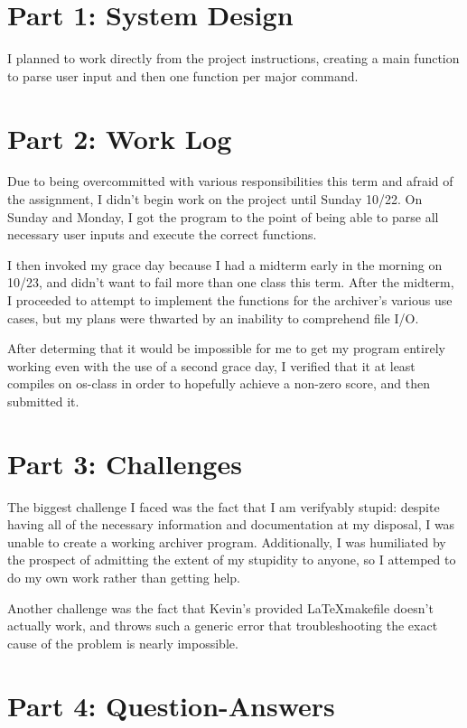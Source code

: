 \documentclass[letterpaper,10pt,titlepage]{article}
\begin{document}
\tableofcontents

\section{Part 1: System Design}

I planned to work directly from the project instructions, creating a main function to parse user input and then one function per major command. 

\section{Part 2: Work Log}

Due to being overcommitted with various responsibilities this term and afraid of the assignment, I didn't begin  work on the project until Sunday 10/22. On Sunday and Monday, I got the program to the point of being able to parse all necessary user inputs and execute the correct functions. 

I then invoked my grace day because I had a midterm early in the morning on 10/23, and didn't want to fail more than one class this term. After the midterm, I proceeded to attempt to implement the functions for the archiver's various use cases, but my plans were thwarted by an inability to comprehend file I/O. 

After determing that it would be impossible for me to get my program entirely working even with the use of a second grace day, I verified that it at least compiles on os-class in order to hopefully achieve a non-zero score, and then submitted it.


\section{Part 3: Challenges}

The biggest challenge I faced was the fact that I am verifyably stupid: despite having all of the necessary information and  documentation at my disposal, I was unable to create a working archiver program. Additionally, I was humiliated by the prospect of admitting the extent of my stupidity to anyone, so I attemped to do my own work rather than getting help. 

Another  challenge was the fact that Kevin's provided \LaTeX makefile doesn't actually work, and throws such a generic error that troubleshooting the exact cause of the problem is nearly impossible. 

\section{Part 4: Question-Answers}
\end{document}
